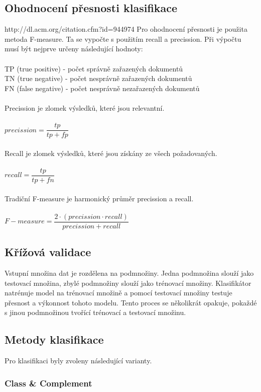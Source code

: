 \documentclass{bakalarka}[12pt]
\begin{document}
\subsection{Ohodnocení přesnosti klasifikace}
http://dl.acm.org/citation.cfm?id=944974
Pro ohodnocení přesnosti je použita metoda  F-measure. Ta se vypočte s použitím recall a precission. Při výpočtu musí být nejprve určeny následující hodnoty: \\\\
TP (true positive) - počet správně zařazených dokumentů \\
TN (true negative) - počet nesprávně zařazených dokumentů \\
FN (false negative) - počet nesprávně nezařazených dokumentů \\\\
Precission je zlomek výsledků, které jsou relevantní. \\ \\
$precission = \dfrac{tp}{tp + fp}$   \\ \\
Recall je zlomek výsledků, které jsou získány ze všech požadovaných.  \\ \\
$recall = \dfrac{tp}{tp + fn}$   \\ \\
Tradiční  F-measure je harmonický průměr precission a recall. \\ \\
$F-measure = \dfrac{2 \cdot( precission \cdot recall )}{precission + recall}$

    
\subsection{Křížová validace}   
Vstupní množina dat je rozdělena na podmnožiny. Jedna podmnožina slouží jako testovací množina, zbylé podmnožiny slouží jako trénovací množiny. Klasifikátor natrénuje model na trénovací množině a pomocí testovací množiny testuje přesnost a výkonnost tohoto modelu. Tento proces se několikrát opakuje, pokaždé s jinou podmnožinou tvořící trénovací a testovací množinu.

\subsection{Metody klasifikace}
Pro klasifikaci byly zvoleny následující varianty.

\subsubsection{Class \& Complement}
\end{document}
